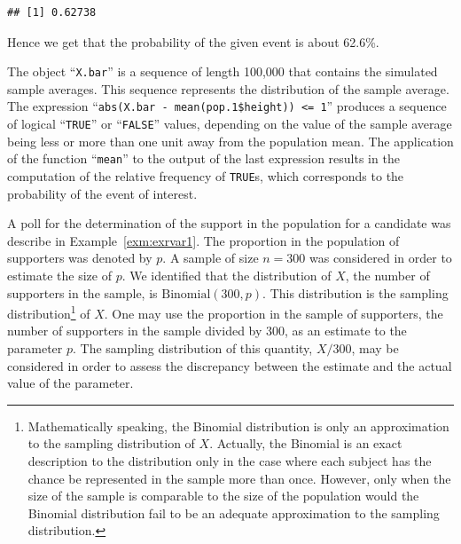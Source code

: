 \documentclass[]{krantz}
\makeatletter
\newenvironment{Shaded}{\begin{snugshade}}{\end{snugshade}}
\newcommand{\DecValTok}[1]{\textcolor[rgb]{0.00,0.00,0.81}{#1}}
\newcommand{\FloatTok}[1]{\textcolor[rgb]{0.00,0.00,0.81}{#1}}
\newcommand{\KeywordTok}[1]{\textcolor[rgb]{0.13,0.29,0.53}{\textbf{#1}}}
\newcommand{\NormalTok}[1]{#1}
\newcommand{\OperatorTok}[1]{\textcolor[rgb]{0.81,0.36,0.00}{\textbf{#1}}}
\newcommand{\StringTok}[1]{\textcolor[rgb]{0.31,0.60,0.02}{#1}}
\newenvironment{kframe}{%
\medskip{}
\setlength{\fboxsep}{.8em}
 \def\at@end@of@kframe{}%
 \ifinner\ifhmode%
  \def\at@end@of@kframe{\end{minipage}}%
  \begin{minipage}{\columnwidth}%
 \fi\fi%
 \def\FrameCommand##1{\hskip\@totalleftmargin \hskip-\fboxsep
 \colorbox{shadecolor}{##1}\hskip-\fboxsep
     \hskip-\linewidth \hskip-\@totalleftmargin \hskip\columnwidth}%
 \MakeFramed {\advance\hsize-\width
   \@totalleftmargin\z@ \linewidth\hsize
   \@setminipage}}%
 {\par\unskip\endMakeFramed%
 \at@end@of@kframe}
\renewenvironment{Shaded}{\begin{kframe}}{\end{kframe}}
\theoremstyle{definition}
\theoremstyle{definition}
\theoremstyle{definition}
\theoremstyle{remark}
\let\BeginKnitrBlock\begin \let\EndKnitrBlock\end
\makeatother
\begin{document}
\begin{Shaded}
\end{Shaded}

\begin{verbatim}
## [1] 0.62738
\end{verbatim}

Hence we get that the probability of the given event is about 62.6\%.

The object ``\texttt{X.bar}'' is a sequence of length 100,000 that contains the
simulated sample averages. This sequence represents the distribution of
the sample average. The expression
``\texttt{abs(X.bar\ -\ mean(pop.1\$height))\ \textless{}=\ 1}'' produces a sequence of logical
``\texttt{TRUE}'' or ``\texttt{FALSE}'' values, depending on the value of the sample
average being less or more than one unit away from the population mean.
The application of the function ``\texttt{mean}'' to the output of the last
expression results in the computation of the relative frequency of
\texttt{TRUE}s, which corresponds to the probability of the event of interest.

\BeginKnitrBlock{example}
\protect\hypertarget{exm:exsampdist1}{}{\label{exm:exsampdist1} }A poll for the determination of the support in the
population for a candidate was describe in
Example~\ref{exm:exrvar1}. The proportion in the population of
supporters was denoted by \(p\). A sample of size \(n=300\) was considered
in order to estimate the size of \(p\). We identified that the
distribution of \(X\), the number of supporters in the sample, is
\(\mathrm{Binomial}(300,p)\). This distribution is the sampling
distribution\footnote{Mathematically speaking, the Binomial distribution is only an
  approximation to the sampling distribution of \(X\). Actually, the
  Binomial is an exact description to the distribution only in the
  case where each subject has the chance be represented in the sample
  more than once. However, only when the size of the sample is
  comparable to the size of the population would the Binomial
  distribution fail to be an adequate approximation to the sampling
  distribution.} of \(X\). One may use the proportion in the sample of
supporters, the number of supporters in the sample divided by 300, as an
estimate to the parameter \(p\). The sampling distribution of this
quantity, \(X/300\), may be considered in order to assess the discrepancy
between the estimate and the actual value of the parameter.
\EndKnitrBlock{example}
\end{document}
